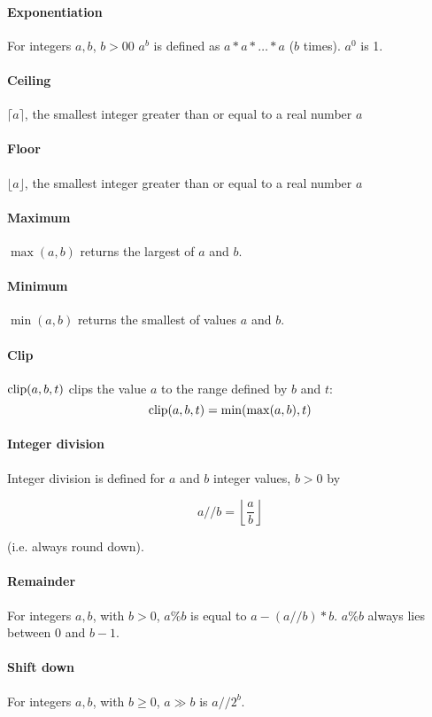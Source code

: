 \paragraph*{Exponentiation} For integers $a, b$, $b>00$ $a^b$ is defined as $a*a*\hdots *a$ ($b$ times). $a^0$ is 1.

\paragraph*{Ceiling} $\lceil a \rceil$, the smallest integer greater than or equal to a real number $a$

\paragraph*{Floor} $\lfloor a \rfloor$, the smallest integer greater than or equal to a real number $a$

\paragraph*{Maximum} $\max(a,b)$ returns the largest of $a$ and $b$.

\paragraph*{Minimum} $\min(a,b)$ returns the smallest of values $a$ and $b$.

\paragraph*{Clip} $\operatorname{clip}(a,b,t)$ clips the value $a$ to the range defined by $b$ and $t$:
\[\operatorname{clip}(a,b,t)=\min(\max(a,b),t)\]

\paragraph*{Integer division} Integer division is defined for $a$ and $b$ integer values, $b>0$ by

\[a//b= \left\lfloor \dfrac{a}{b} \right\rfloor\]

(i.e. always round down).

\paragraph*{Remainder} For integers $a,b$, with $b>0$, $a\%b$ is equal to $a-(a//b)*b$. $a\%b$ always lies between 0 and $b-1$.

\paragraph*{Shift down} For integers $a,b$, with $b\geq 0$, $a\gg b$ is $a//2^b$.

